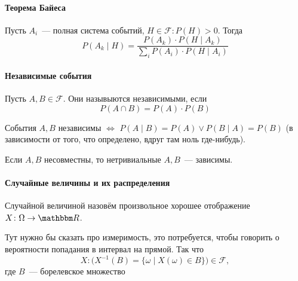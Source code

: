 \documentclass[12pt,timbord]{../../../notes}
\begin{document}
\paragraph{Теорема Байеса}
\label{par:prob::bayes}

\begin{thrm}\label{thrm:prob::bayes}
  Пусть $A_i$~--- полная система событий, $H\in \mathcal F\colon P(H)>0$. Тогда 
  \[
    P(A_k \mid H) = \frac{P(A_k)\cdot P(H \mid A_k)}{\sum_i P(A_i)\cdot P(H\mid A_i)} 
  \]
\end{thrm}

\paragraph{Независимые события}
\label{par:prob::indep}

\begin{defn}\label{defn:prob::indep::indep}
  Пусть $A, B\in \mathcal F$. Они назывыются независимыми, если 
  \[
    P(A\cap B) = P(A)\cdot P(B)
  \]
\end{defn}

\begin{prop}\label{prop:prob::indep::cond}
  События $A,B$ независимы $ \Leftrightarrow $ $P(A\mid B) = P(A) \lor P(B\mid A) = P(B)$ (в
  зависимости от того, что определено, вдруг там ноль где-нибудь).
\end{prop}
\begin{prop}\label{prop:prob::indep::zerodep}
  Если $A,B$ несовместны, то нетривиальные $A,B$~--- зависимы.
\end{prop}

\paragraph{Случайные величины и их распределения}
\label{par:prob::randscal}

\begin{defn}\label{defn:prob::randscal::randscal}
  Случайной величиной назовём произвольное хорошее отображение $X\colon \Omega \to \R$.
  
  \begin{itaux}\label{rem:prob::randscal::meas}
    Тут нужно бы сказать про измеримость, это потребуется, чтобы говорить о вероятности попадания в
    интервал на прямой. Так что \[
      X\colon \bigl(X^{-1} (B) =\{\omega \mid X(\omega)\in B\}\bigr)\in \mathcal F,
    \]
    где $B$~--- борелевское множество
  \end{itaux}

\end{defn}
\end{document}
